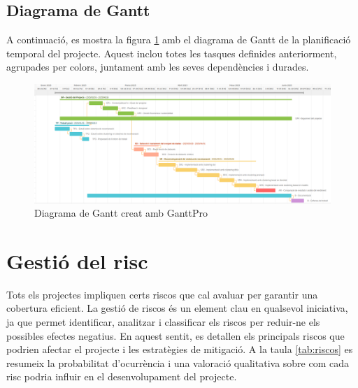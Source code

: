 \documentclass[a4paper,12pt]{report}
\begin{document}
\begin{landscape} %

    \section{Diagrama de Gantt}

    A continuació, es mostra la figura \ref{fig:gantt} amb el diagrama de Gantt de la planificació temporal del projecte. Aquest inclou totes les tasques definides anteriorment, agrupades per colors, juntament amb les seves dependències i durades.

    \begin{figure} [H]
        \centering
        \includegraphics[width=1.5\textwidth]{Figuras/DiagramaGantt.png}
        \caption{Diagrama de Gantt creat amb GanttPro \cite{GanttPRO}}
        \label{fig:gantt}
    \end{figure}

\end{landscape} %

\section{Gestió del risc}

Tots els projectes impliquen certs riscos que cal avaluar per garantir una cobertura eficient.
La gestió de riscos és un element clau en qualsevol iniciativa, ja que permet identificar, analitzar i classificar els riscos per reduir-ne els possibles efectes negatius.
En aquest sentit, es detallen els principals riscos que podrien afectar el projecte i les estratègies de mitigació.
A la taula \ref{tab:riscos} es resumeix la probabilitat d'ocurrència i una valoració qualitativa sobre com cada risc podria influir en el desenvolupament del projecte.
\end{document}
